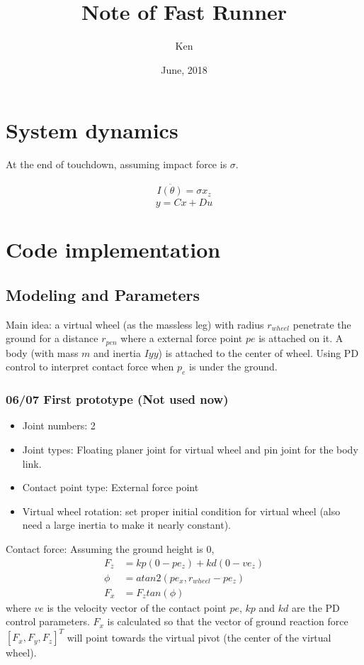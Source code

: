 \documentclass{article}
\title{Note of Fast Runner}
\author{Ken}
\date{June, 2018}
\begin{document}
\maketitle
\section{System dynamics}

At the end of touchdown, assuming impact force is $\sigma$.

\begin{align}
\label{eqn:SLIP1}
I \ddot{(\theta)} = \sigma  x_z
\end{align}
\[
y={C}x+{D}u\]

\section{Code implementation}

\subsection{Modeling and Parameters}
Main idea: a virtual wheel (as the massless leg) with radius $r_{wheel}$ penetrate the ground for a distance $r_{pen}$ where a external force point $pe$ is attached on it. A body (with mass $m$ and inertia $Iyy$) is attached to the center of wheel. 
Using PD control to interpret contact force when $p_e$ is under the ground.

\subsubsection*{06/07 First prototype (Not used now)}
\begin{itemize}
\item Joint numbers: 2
\item Joint types: Floating planer joint for virtual wheel and pin joint for the body link.
\item Contact point type: External force point
\item Virtual wheel rotation: set proper initial condition for virtual wheel (also need a large inertia to make it nearly constant).
\end{itemize}

Contact force: Assuming the ground height is $0$,
\begin{align}
F_z &= kp(0-pe_z) + kd(0 - ve_z)\\
\phi &= atan2(pe_x,r_{wheel}-pe_z)\\
F_x &= F_ztan(\phi)
\end{align}
where $ve$ is the velocity vector of the contact point $pe$, $kp$ and $kd$ are the PD control parameters. $F_x$ is calculated so that the vector of ground reaction force $[F_x,F_y,F_z]^T$ will point towards the virtual pivot (the center of the virtual wheel).\\
\end{document}
